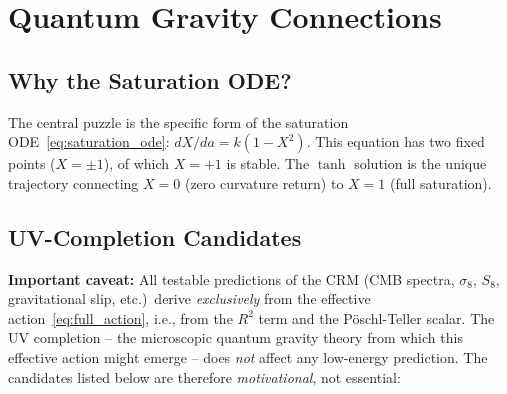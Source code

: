 \documentclass[aps,prd,twocolumn,superscriptaddress,nofootinbib]{revtex4-2}
\begin{document}
\section{Quantum Gravity Connections}
\label{sec:quantum_gravity}

\subsection{Why the Saturation ODE?}

The central puzzle is the specific form of the saturation ODE~\eqref{eq:saturation_ode}: $dX/da = k(1 - X^2)$. This equation has two fixed points ($X = \pm 1$), of which $X = +1$ is stable. The $\tanh$ solution is the unique trajectory connecting $X = 0$ (zero curvature return) to $X = 1$ (full saturation).

\subsection{UV-Completion Candidates}
\label{subsec:uv_candidates}

\textbf{Important caveat:} All testable predictions of the CRM (CMB spectra, $\sigma_8$, $S_8$, gravitational slip, etc.)\ derive \textit{exclusively} from the effective action~\eqref{eq:full_action}, i.e., from the $R^2$ term and the P\"oschl-Teller scalar. The UV completion -- the microscopic quantum gravity theory from which this effective action might emerge -- does \textit{not} affect any low-energy prediction. The candidates listed below are therefore \textit{motivational}, not essential:
\end{document}
